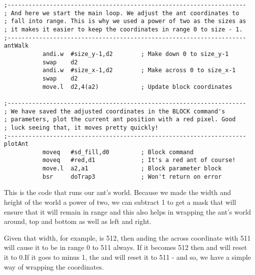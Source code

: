 \begin{lstlisting}[firstnumber=last,caption={Langtons Ant - Start of Loop}]
;--------------------------------------------------------------------
; And here we start the main loop. We adjust the ant coordinates to
; fall into range. This is why we used a power of two as the sizes as
; it makes it easier to keep the coordinates in range 0 to size - 1.
;--------------------------------------------------------------------
antWalk
           andi.w  #size_y-1,d2        ; Make down 0 to size_y-1
           swap    d2
           andi.w  #size_x-1,d2        ; Make across 0 to size_x-1
           swap    d2
           move.l  d2,4(a2)            ; Update block coordinates

;--------------------------------------------------------------------
; We have saved the adjusted coordinates in the BLOCK command's 
; parameters, plot the current ant position with a red pixel. Good
; luck seeing that, it moves pretty quickly!
;--------------------------------------------------------------------
plotAnt
           moveq   #sd_fill,d0         ; Block command
           moveq   #red,d1             ; It's a red ant of course!
           move.l  a2,a1               ; Block parameter block
           bsr     doTrap3             ; Won't return on error

\end{lstlisting}

This is the code that runs our ant's world. Because we made the width and height of the world a power of two, we can subtract 1 to get a mask that will ensure that it will remain in range and this also helps in wrapping the ant's world around, top and bottom as well as left and right. 

Given that width, for example, is 512, then anding the across coordinate with 511 will cause it to be in range 0 to 511 always. If it becomes 512 then and will reset it to 0.If it goes to minus 1, the and will reset it to 511 - and so, we have a simple way of wrapping the coordinates.

